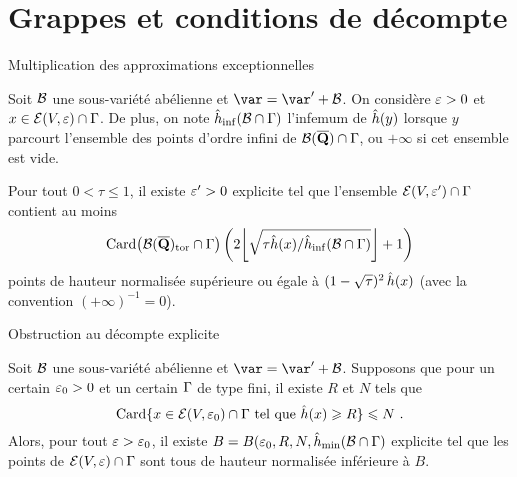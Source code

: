 \documentclass{mpg-thslides}
\begin{document}

\section[Grappes]{Grappes et conditions de décompte}
\tocsect

\begin{frame}{Multiplication des approximations exceptionnelles}
  \begin{prop}
    Soit \( \mathcal B \) une sous-variété abélienne et \( \var = \var' + \vai \).
    On considère \( \varepsilon > 0 \) et \( x \in \mathcal E(V, \varepsilon) \cap \Gamma \).
    De plus, on note \( \hat h_{\mathrm{inf}}(\mathcal B \cap \Gamma) \) l'infemum de \( \hat h (y) \)
    lorsque \( y \) parcourt l'ensemble des points d'ordre infini de
    \( \mathcal B(\overline{{\mathbf{Q}}}) \cap \Gamma \), ou \( +\infty \) si cet ensemble est vide.

    Pour tout \( 0 < \tau \le 1 \), il existe \( \varepsilon' > 0 \) explicite tel que
    l'ensemble \( \mathcal E(V, \varepsilon') \cap \Gamma \) contient au moins
    \begin{equation}
      \card \bigl( \vai(\Qbar)_\torsion \cap \grp \bigr)
      \left(
        2 \floor*{ \sqrt{ \tau \hautn x / \hinf(\vai \cap \grp) } } + 1
      \right)
    \end{equation}
    points de hauteur normalisée supérieure ou égale à
    \( (1-\sqrt\tau)^{2} \, \hat h (x) \) (avec la convention \( (+\infty)^{-1} =
      0 \)).
  \end{prop}
\end{frame}

\begin{frame}{Obstruction au décompte explicite}
  \begin{coro}
    Soit \( \mathcal B \) une sous-variété abélienne et \( \var = \var' + \vai \).
    Supposons que pour un certain \( \varepsilon_0 > 0 \) et un certain \( \Gamma \) de
    type fini, il existe \( R \) et \( N \) tels que
    \begin{equation}
      \operatorname{Card}
      \lbrace
        x \in \mathcal E(V, \varepsilon_0) \cap \Gamma
        \text{ tel que }
        \hat h (x) \geqslant R
      \rbrace
      \leqslant
      N
      \text{ .}
    \end{equation}
    Alors, pour tout \( \varepsilon > \varepsilon_0 \), il existe \( B = B(\varepsilon_0, R, N,
      \hat h_{\mathrm{min}}(\mathcal B \cap \Gamma) \) explicite tel que les points de \( \mathcal E(V,
      \varepsilon) \cap \Gamma \) sont tous de hauteur normalisée inférieure à \( B \).
  \end{coro}
\end{frame}
\end{document}
